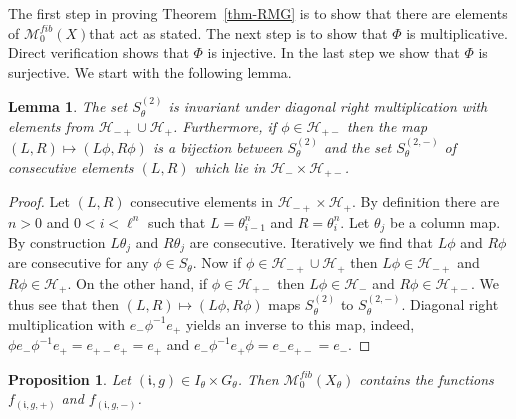 \documentclass[12pt]{amsart}
\newtheorem{lemma}[theorem]{Lemma}
\newtheorem{prop}[theorem]{Proposition}
\theoremstyle{definition}
\numberwithin{equation}{section}
\newcommand{\ii}{{\mathfrak i}}
\newcommand{\Hh}{{\mathcal H}}
\newcommand{\M}{\mathcal M}
\newcommand{\Sfib}{\M^{fib}_0(X_\theta)}
\begin{document}
 The first step in proving Theorem~\ref{thm-RMG}  is to show that there are  elements of $\M^{fib}_0(X)$that  act as stated. The next step is to show that $\Phi$ is multiplicative. 
Direct verification shows that $\Phi$ is injective. In the last step we show that $\Phi$ is surjective. We start with the following  lemma.
\begin{lemma} \label{lem-neg}
The set $S^{(2)}_\theta$ is invariant under diagonal right multiplication with elements from $\Hh_{-+}\cup \Hh_{+}$. Furthermore, if 
$\phi \in\Hh_{+-}$ then  %
the map $(L,R) \mapsto (L\phi,R\phi)$ is a bijection between $S^{(2)}_\theta$ and the set $S^{(2,-)}_\theta$ of consecutive elements $(L,R)$ which lie in $\Hh_{-}\times\Hh_{+-}$. 
\end{lemma}
\begin{proof} Let $(L,R)$ consecutive elements in $\Hh_{-+}\times \Hh_{+}$. By definition %
there are $n>0$ and $0 < i < \ell^n$ such that $L=\theta^n_{i-1}$ and $R=\theta^n_{i}$. Let $\theta_j$ be a column map. By construction $L\theta_j$ and $R\theta_j$ are consecutive. Iteratively we find that 
 $L\phi$ and $R\phi$ are consecutive for any $\phi\in S_\theta$. Now if $\phi\in \Hh_{-+}\cup \Hh_{+}$ then $L\phi \in \Hh_{-+}$  and $R\phi \in \Hh_{+}$. On the other hand, if $\phi\in \Hh_{+-}$ then  $L\phi\in \Hh_{-}$ and $R\phi\in \Hh_{+-}$. We thus see that then $(L,R) \mapsto (L\phi,R\phi)$ maps $S^{(2)}_\theta$ to $S^{(2,-)}_\theta$. Diagonal right multiplication with $e_-\phi^{-1} e_+$ yields an inverse to this map, indeed, $\phi e_-\phi^{-1} e_+ = e_{+-}e_+ = e_+$ and $e_-\phi^{-1} e_+ \phi= e_- e_{+-} = e_-$.
\end{proof}
\begin{prop} \label{prop-hin}
Let $(\ii ,g)\in I_\theta \times G_\theta$.
Then $\Sfib$ contains the functions 
$f_{(\ii ,g,+ )}$ and $f_{(\ii ,g,-)}$.
\end{prop}
\end{document}
